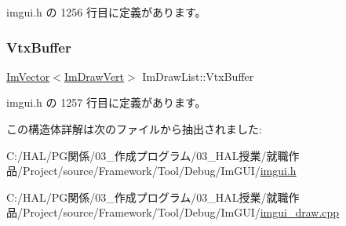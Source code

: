 imgui.\+h の 1256 行目に定義があります。

\mbox{\label{struct_im_draw_list_aa8ff4aee39cf3c3791b7e29a7b4264be}} 
\subsubsection{\texorpdfstring{Vtx\+Buffer}{VtxBuffer}}
{\footnotesize\ttfamily \mbox{\hyperlink{class_im_vector}{Im\+Vector}}$<$\mbox{\hyperlink{struct_im_draw_vert}{Im\+Draw\+Vert}}$>$ Im\+Draw\+List\+::\+Vtx\+Buffer}



 imgui.\+h の 1257 行目に定義があります。



この構造体詳解は次のファイルから抽出されました\+:\begin{DoxyCompactItemize}
\item 
C\+:/\+H\+A\+L/\+P\+G関係/03\+\_\+作成プログラム/03\+\_\+\+H\+A\+L授業/就職作品/\+Project/source/\+Framework/\+Tool/\+Debug/\+Im\+G\+U\+I/\mbox{\hyperlink{imgui_8h}{imgui.\+h}}\item 
C\+:/\+H\+A\+L/\+P\+G関係/03\+\_\+作成プログラム/03\+\_\+\+H\+A\+L授業/就職作品/\+Project/source/\+Framework/\+Tool/\+Debug/\+Im\+G\+U\+I/\mbox{\hyperlink{imgui__draw_8cpp}{imgui\+\_\+draw.\+cpp}}\end{DoxyCompactItemize}
